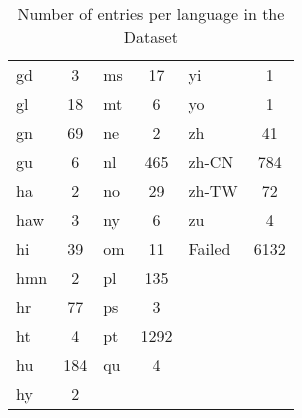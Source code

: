 \begin{table}
{\begin{tabular}{lclclc}
gd & 3 & ms & 17 & yi & 1 \\
gl & 18 & mt & 6 & yo & 1 \\
gn & 69 & ne & 2 & zh & 41 \\
gu & 6 & nl & 465 & zh-CN & 784 \\
ha & 2 & no & 29 & zh-TW & 72 \\
haw & 3 & ny & 6 & zu & 4 \\
hi & 39 & om & 11 & Failed & 6132 \\
hmn & 2 & pl & 135 & \ & \ \\
hr & 77 & ps & 3 & \ & \ \\
ht & 4 & pt & 1292 & \ & \ \\
hu & 184 & qu & 4 & \ & \ \\
hy & 2 & \ & \ & \ & \ \\
\end{tabular}
}
\caption{Number of entries per language in the \VSI{} Dataset}
\label{appendix01:tab:language_distribution}
\end{table}


